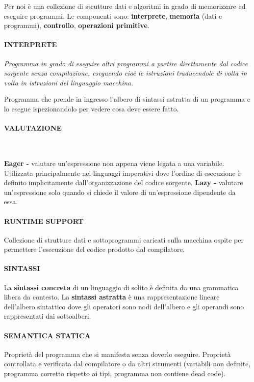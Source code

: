 \documentclass[a4paper, 12pt]{article}
\begin{document}
Per noi è una collezione di strutture dati e algoritmi in grado di memorizzare ed eseguire
programmi. Le componenti sono: \textbf{interprete}, \textbf{memoria} (dati e programmi),
\textbf{controllo}, \textbf{operazioni primitive}.

\paragraph{INTERPRETE}
\textit{Programma in grado di eseguire altri programmi a partire direttamente dal codice
sorgente senza compilazione, eseguendo cioè le istruzioni traducendole di volta in volta in
istruzioni del linguaggio macchina.}

Programma che prende in ingresso l'albero di sintassi astratta di un programma e lo esegue
ispezionandolo per vedere cosa deve essere fatto.

\paragraph{VALUTAZIONE} \

\textbf{Eager -} valutare un'espressione non appena viene legata a una variabile.
Utilizzata principalmente nei linguaggi imperativi dove l'ordine di esecuzione è definito
implicitamente dall'organizzazione del codice sorgente.
\textbf{Lazy -} valutare un'espressione solo quando si chiede il valore di un'espressione
dipendente da essa.

\paragraph{RUNTIME SUPPORT}
Collezione di strutture dati e sottoprogrammi caricati sulla macchina ospite per permettere
l'esecuzione del codice prodotto dal compilatore.

\paragraph{SINTASSI}
La \textbf{sintassi concreta} di un linguaggio di solito è definita da una grammatica
libera da contesto. La \textbf{sintassi astratta} è una rappresentazione lineare
dell'albero sintattico dove gli operatori sono nodi dell'albero e gli operandi sono
rappresentati dai sottoalberi.

\paragraph{SEMANTICA STATICA}
Proprietà del programma che si manifesta senza doverlo eseguire. Proprietà controllata e
verificata dal compilatore o da altri strumenti (variabili non definite, programma corretto
rispetto ai tipi, programma non contiene dead code).
\end{document}
